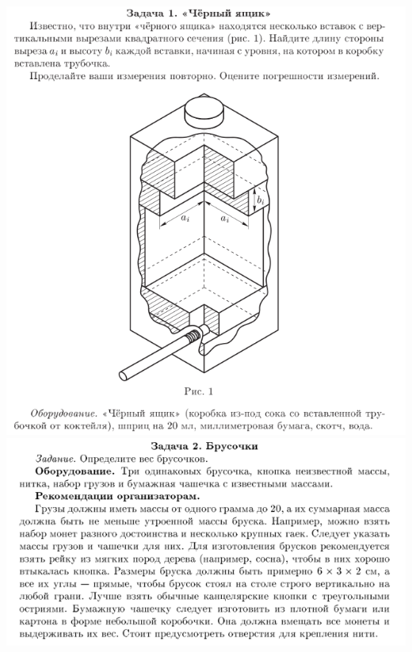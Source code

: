 \begin{center}
  \includegraphics[width=16cm]{exp5}
  \includegraphics[width=16cm]{exp6}
\end{center}





